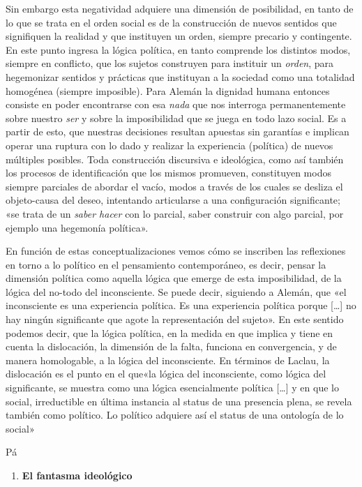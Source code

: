 Sin embargo esta negatividad adquiere una dimensión de posibilidad, en tanto de lo que se trata en el orden social es de la construcción de nuevos sentidos que signifiquen la realidad y que instituyen un orden, siempre precario y contingente. En este punto ingresa la lógica política, en tanto comprende los distintos modos, siempre en conflicto, que los sujetos construyen para instituir un \emph{orden}, para hegemonizar sentidos y prácticas que instituyan a la sociedad como una totalidad homogénea (siempre imposible). Para Alemán la dignidad humana entonces consiste en poder encontrarse con esa \emph{nada} que nos interroga permanentemente sobre nuestro \emph{ser }y sobre la imposibilidad que se juega en todo lazo social. Es a partir de esto, que nuestras decisiones resultan apuestas sin garantías e implican operar una ruptura con lo dado y realizar la experiencia (política) de nuevos múltiples posibles. Toda construcción discursiva e ideológica, como así también los procesos de identificación que los mismos promueven, constituyen modos siempre parciales de abordar el vacío, modos a través de los cuales se desliza el objeto-causa del deseo, intentando articularse a una configuración significante; «se trata de un \emph{saber hacer} con lo parcial, saber construir con algo parcial, por ejemplo una hegemonía política».

En función de estas conceptualizaciones vemos cómo se inscriben las reflexiones en torno a lo político en el pensamiento contemporáneo, es decir, pensar la dimensión política como aquella lógica que emerge de esta imposibilidad, de la lógica del no-todo del inconsciente. Se puede decir, siguiendo a Alemán, que «el inconsciente es una experiencia política. Es una experiencia política porque {[}\ldots{]} no hay ningún significante que agote la representación del sujeto». En este sentido podemos decir, que la lógica política, en la medida en que implica y tiene en cuenta la dislocación, la dimensión de la falta, funciona en convergencia, y de manera homologable, a la lógica del inconsciente. En términos de Laclau, la dislocación es el punto en el que«la lógica del inconsciente, como lógica del significante, se muestra como una lógica esencialmente política {[}\ldots{]} y en que lo social, irreductible en última instancia al status de una presencia plena, se revela también como político. Lo político adquiere así el status de una ontología de lo social»

Pá

\begin{enumerate}
\def\labelenumi{\arabic{enumi}.}
\item
  \textbf{El fantasma ideológico}
\end{enumerate}

